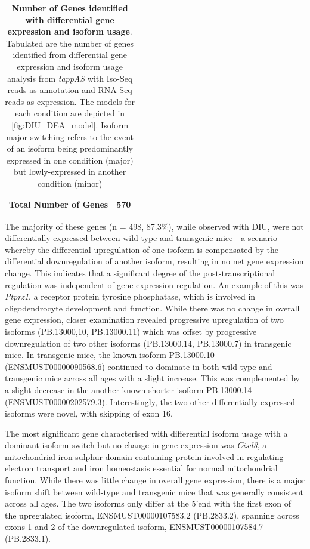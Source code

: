 \begin{table}[!htp]
\begin{tabularx}{0.85\textwidth}{cccc}
		\multicolumn{3}{c}{Total Number of Genes}                                                                                                                                                                            & 570                              \\ \bottomrule
	\end{tabularx}
	\caption[Number of Genes identified with differential gene expression and isoform usage]%
	{\textbf{Number of Genes identified with differential gene expression and isoform usage}. Tabulated are the number of genes identified from differential gene expression and isoform usage analysis from \textit{tappAS} with Iso-Seq reads as annotation and RNA-Seq reads as expression. The models for each condition are depicted in \cref{fig:DIU_DEA_model}. Isoform major switching refers to the event of an isoform being predominantly expressed in one condition (major) but lowly-expressed in another condition (minor)}
	\label{tab:DIU_DEA_nums}
\end{table}

The majority of these genes (n = 498, 87.3\%), while observed with DIU, were not differentially expressed between wild-type and transgenic mice - a scenario whereby the differential upregulation of one isoform is compensated by the differential downregulation of another isoform, resulting in no net gene expression change. This indicates that a significant degree of the post-transcriptional regulation was independent of gene expression regulation. An example of this was \textit{Ptprz1}, a receptor protein tyrosine phosphatase, which is involved in oligodendrocyte development and function. While there was no change in overall gene expression, closer examination revealed progressive upregulation of two isoforms (PB.13000,10, PB.13000.11) which was offset by progressive downregulation of two other isoforms (PB.13000.14, PB.13000.7) in transgenic mice. In transgenic mice, the known isoform PB.13000.10 (ENSMUST00000090568.6) continued to dominate in both wild-type and transgenic mice across all ages with a slight increase. This was complemented by a slight decrease in the another known shorter isoform PB.13000.14 (ENSMUST00000202579.3). Interestingly, the two other differentially expressed isoforms were novel, with skipping of exon 16. 

The most significant gene characterised with differential isoform usage with a dominant isoform switch but no change in gene expression was \textit{Cisd3}, a mitochondrial iron-sulphur domain-containing protein involved in regulating electron transport and iron homeostasis essential for normal mitochondrial function. While there was little change in overall gene expression, there is a major isoform shift between wild-type and transgenic mice that was generally consistent across all ages. The two isoforms only differ at the 5'end with the first exon of the upregulated isoform, ENSMUST00000107583.2 (PB.2833.2), spanning across exons 1 and 2 of the downregulated isoform, ENSMUST00000107584.7 (PB.2833.1). 

